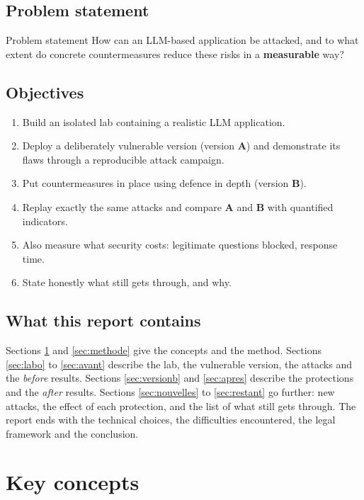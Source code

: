 \documentclass[11pt,a4paper]{article}
\newcommand{\va}{\textcolor{rouge}{\textbf{A}}}
\newcommand{\vb}{\textcolor{vert}{\textbf{B}}}
\begin{document}
\subsection{Problem statement}
\begin{boiteinfo}{Problem statement}
How can an LLM-based application be attacked, and to what extent do concrete countermeasures reduce these risks in a \textbf{measurable} way?
\end{boiteinfo}

\subsection{Objectives}
\begin{enumerate}
  \item Build an isolated lab containing a realistic LLM application.
  \item Deploy a deliberately vulnerable version (version \va{}) and demonstrate its flaws through a reproducible attack campaign.
  \item Put countermeasures in place using defence in depth (version \vb{}).
  \item Replay exactly the same attacks and compare \va{} and \vb{} with quantified indicators.
  \item Also measure what security costs: legitimate questions blocked, response time.
  \item State honestly what still gets through, and why.
\end{enumerate}

\subsection{What this report contains}
Sections \ref{sec:notions} and \ref{sec:methode} give the concepts and the method. Sections \ref{sec:labo} to \ref{sec:avant} describe the lab, the vulnerable version, the attacks and the \emph{before} results. Sections \ref{sec:versionb} and \ref{sec:apres} describe the protections and the \emph{after} results. Sections \ref{sec:nouvelles} to \ref{sec:restant} go further: new attacks, the effect of each protection, and the list of what still gets through. The report ends with the technical choices, the difficulties encountered, the legal framework and the conclusion.

\section{Key concepts}
\label{sec:notions}
\end{document}
